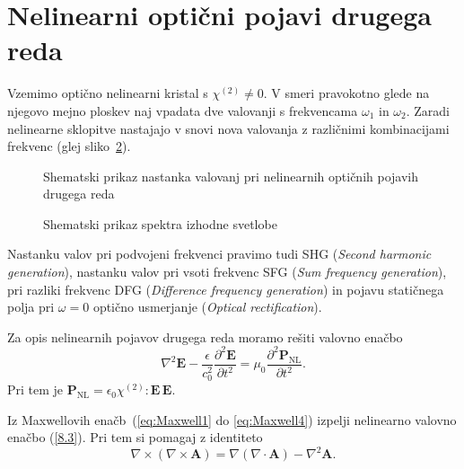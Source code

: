 \section{Nelinearni optični pojavi drugega reda}

Vzemimo optično nelinearni kristal s $\chi^{(2)} \neq 0$. V smeri pravokotno 
glede na njegovo mejno ploskev naj vpadata dve valovanji s frekvencama
$\omega_{1}$ in $\omega_{2}$. Zaradi nelinearne sklopitve nastajajo v snovi nova 
valovanja z različnimi kombinacijami frekvenc (glej sliko~\ref{fig:nl2}).
\begin{figure}[h]
\centering
\def\svgwidth{100truemm} 

\caption{Shematski prikaz nastanka valovanj pri nelinearnih optičnih pojavih drugega reda}
\label{fig:nl2}
\end{figure}

\begin{figure}[h]
\centering
\def\svgwidth{120truemm} 

\caption{Shematski prikaz spektra izhodne svetlobe}
\label{fig:nl2}
\end{figure}

Nastanku valov pri podvojeni frekvenci pravimo tudi 
SHG ({\it Second harmonic 
generation}), 
nastanku valov pri vsoti frekvenc SFG
({\it Sum frequency generation}), 
pri razliki frekvenc DFG 
({\it Difference frequency generation}) in pojavu 
statičnega polja pri $\omega = 0$ optično usmerjanje
({\it Optical rectification}).  

Za opis nelinearnih pojavov drugega reda moramo rešiti valovno enačbo 
\begin{equation}
\nabla^{2}\mathbf{E}-\frac{\epsilon}{c_0^{2}}{\frac{\partial^2\mathbf{E}}{\partial t^2}}=
\mu_{0}{\frac{\partial^2\mathbf{P}_{\textrm{NL}}}{\partial t^2}}.
\label{8.3}
\end{equation}
Pri tem je $\mathbf{P}_{\textrm{NL}}=\epsilon_{0}\chi^{(2)}:\mathbf{E}\, \mathbf{E}$.

\begin{definition}
Iz Maxwellovih enačb~(\ref{eq:Maxwell1} do \ref{eq:Maxwell4}) izpelji 
nelinearno valovno enačbo (\ref{8.3}). Pri tem si pomagaj z identiteto
$$
\nabla \times (\nabla \times \mathbf{A}) = \nabla (\nabla \cdot \mathbf{A}) 
- \nabla^2 \mathbf{A}.
$$
\end{definition}

